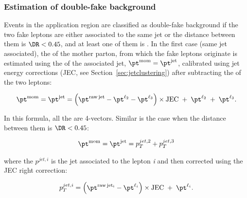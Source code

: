 \subsubsection{Estimation of double-fake background}
\label{sec:doubleFakeBkg}

Events in the application region are classified as double-fake
background if the two fake leptons are either associated to the same
jet or the distance between them is $\DR<0.45$, and at least one of them is \fo.
In the first case (same jet associated), the \pt of the mother parton, \ptm from
which the fake leptons originate is estimated using the \pt of the associated
jet, $\ptm=\ptj$, calibrated using jet energy corrections (JEC, see
Section~\ref{sec:jetclustering}) after subtracting the \pt of the two leptons:
\begin{linenomath}
  \begin{equation}
    \label{eq:ptjet}
    \ptm = \ptj =
    \left(\pt^{\mathrm{raw\,jet}}-\pt^{\ltwo}-\pt^{\lthree}\right)\times\mathrm{JEC}
    \;+\; \pt^{\ltwo} \;+\; \pt^{\lthree}.
  \end{equation}
\end{linenomath}
In this formula, all the \pt are 4-vectors.
Similar is the case when the distance between them is $\DR<0.45$:
\begin{linenomath}
  \begin{equation}
    \label{eq:ptjet_45}
    \ptm = \ptj = p^{jet,2}_T + p^{jet,3}_T 
  \end{equation}
\end{linenomath}
where the $p^{jet,i}$ is the jet associated to the lepton \emph{i} and then corrected using the JEC right correction:
\begin{linenomath}
  \begin{equation}
    \label{eq:ptjet_45_single}
    p_T^{jet,i} = \left(\pt^{\mathrm{raw\,jet_i}}-\pt^{\ell_{i}}\right)\times\mathrm{JEC}\;+\; \pt^{\ell_i} .
  \end{equation}
\end{linenomath}

